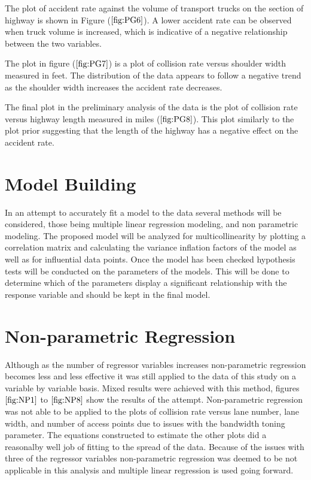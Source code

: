 \documentclass[12pt]{report}
\begin{document}
The plot of accident rate against the volume of transport trucks on the section of highway is shown in Figure ($\ref{fig:PG6}$). A lower accident rate can be observed when truck volume is increased, which is indicative of a negative relationship between the two variables.

The plot in figure ($\ref{fig:PG7}$) is a plot of collision rate versus shoulder width measured in feet. The distribution of the data appears to follow a negative trend as the shoulder width increases the accident rate decreases. 

The final plot in the preliminary analysis of the data is the plot of collision rate versus highway length measured in miles ($\ref{fig:PG8}$). This plot similarly to the plot prior suggesting that the length of the highway has a negative effect on the accident rate.

\section{Model Building}
In an attempt to accurately fit a model to the data several methods will be considered, those being multiple linear regression modeling, and non parametric modeling. The proposed model will be analyzed for multicollinearity by plotting a correlation matrix and calculating the variance inflation factors of the model as well as for influential data points. Once the model has been checked hypothesis tests will be conducted on the parameters of the models. This will be done to determine which of the parameters display a significant relationship with the response variable and should be kept in the final model. 

\section{Non-parametric Regression}
Although as the number of regressor variables increases non-parametric regression becomes less and less effective it was still applied to the data of this study on a variable by variable basis. Mixed results were achieved with this method, figures $\ref{fig:NP1}$ to $\ref{fig:NP8}$ show the results of the attempt. Non-parametric regression was not able to be applied to the plots of collision rate versus lane number, lane width, and number of access points due to issues with the bandwidth toning parameter. The equations constructed to estimate the other plots did a reasonalby well job of fitting to the spread of the data. Because of the issues with three of the regressor variables non-parametric regression was deemed to be not applicable in this analysis and multiple linear regression is used going forward. 
\end{document}
